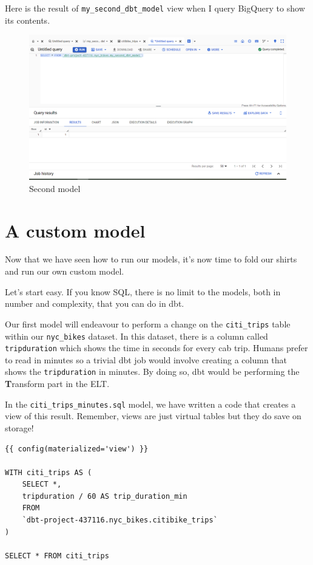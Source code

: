 \documentclass[
]{book}
\begin{document}
Here is the result of \texttt{my\_second\_dbt\_model} view when I query BigQuery to show its contents.

\begin{figure}
\centering
\includegraphics{./images/second_model.png}
\caption{Second model}
\end{figure}

\hypertarget{a-custom-model}{%
\section{A custom model}\label{a-custom-model}}

Now that we have seen how to run our models, it's now time to fold our shirts and run our own custom model.

Let's start easy. If you know SQL, there is no limit to the models, both in number and complexity, that you can do in dbt.

Our first model will endeavour to perform a change on the \texttt{citi\_trips} table within our \texttt{nyc\_bikes} dataset. In this dataset, there is a column called \texttt{tripduration} which shows the time in seconds for every cab trip. Humans prefer to read in minutes so a trivial dbt job would involve creating a column that shows the \texttt{tripduration} in minutes. By doing so, dbt would be performing the \textbf{T}ransform part in the ELT.

In the \texttt{citi\_trips\_minutes.sql} model, we have written a code that creates a view of this result. Remember, views are just virtual tables but they do save on storage!

\begin{verbatim}
{{ config(materialized='view') }}

WITH citi_trips AS (
    SELECT *, 
    tripduration / 60 AS trip_duration_min
    FROM 
    `dbt-project-437116.nyc_bikes.citibike_trips` 
)

SELECT * FROM citi_trips
\end{verbatim}
\end{document}
